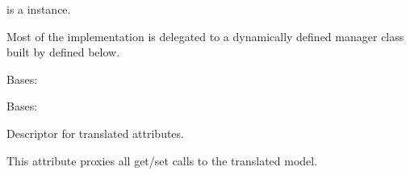 \documentclass[letterpaper,10pt,english]{sphinxmanual}
\begin{document}
\begin{fulllineitems}
\begin{fulllineitems}
\sphinxAtStartPar
{} is a  instance.

\sphinxAtStartPar
Most of the implementation is delegated to a dynamically defined manager
class built by  defined below.

\end{fulllineitems}


\begin{fulllineitems}
\label{\detokenize{index:bookings.models.OtherPrice.DoesNotExist}}
\pysigstartsignatures
\pysigline
{}
\pysigstopsignatures
\sphinxAtStartPar
Bases: 

\end{fulllineitems}


\begin{fulllineitems}
\label{\detokenize{index:bookings.models.OtherPrice.MultipleObjectsReturned}}
\pysigstartsignatures
\pysigline
{}
\pysigstopsignatures
\sphinxAtStartPar
Bases: 

\end{fulllineitems}


\begin{fulllineitems}
\label{\detokenize{index:bookings.models.OtherPrice.current_year}}
\pysigstartsignatures
\pysigline
{}
\pysigstopsignatures
\sphinxAtStartPar
Descriptor for translated attributes.

\sphinxAtStartPar
This attribute proxies all get/set calls to the translated model.

\end{fulllineitems}



\end{fulllineitems}
\end{document}
